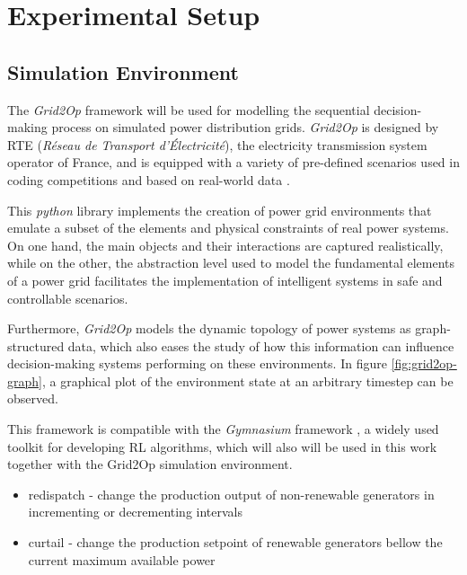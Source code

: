 \chapter{Experimental Setup}

\section{Simulation Environment}

The \textit{Grid2Op} framework \cite{rtefranceGrid2OpDocumentation} will be used for modelling the sequential decision-making process on simulated power distribution grids. \textit{Grid2Op} is designed by RTE (\textit{Réseau de Transport d'Électricité}), the electricity transmission system operator of France, and is equipped with a variety of pre-defined scenarios used in coding competitions and based on real-world data \cite{rtefranceGrid2OpDocumentation}. \par
This \textit{python} library implements the creation of power grid environments that emulate a subset of the elements and physical constraints of real power systems. On one hand, the main objects and their interactions are captured realistically, while on the other, the abstraction level used to model the fundamental elements of a power grid facilitates the implementation of intelligent systems in safe and controllable scenarios. \par
Furthermore, \textit{Grid2Op} models the dynamic topology of power systems as graph-structured data, which also eases the study of how this information can influence decision-making systems performing on these environments.  In figure \ref{fig:grid2op-graph}, a graphical plot of the environment state at an arbitrary timestep can be observed. \par
This framework is compatible with the \textit{Gymnasium} framework \cite{faramafoundationGymnasiumDocumentation}, a widely used toolkit for developing \ac{RL} algorithms, which will also will be used in this work together with the Grid2Op simulation environment. 

\begin{itemize}
	\item redispatch - change the production output of non-renewable generators in incrementing or decrementing intervals 
	\item curtail - change the production setpoint of renewable generators bellow the current maximum available power \cite{rtefranceGrid2OpDocumentation}
\end{itemize}



